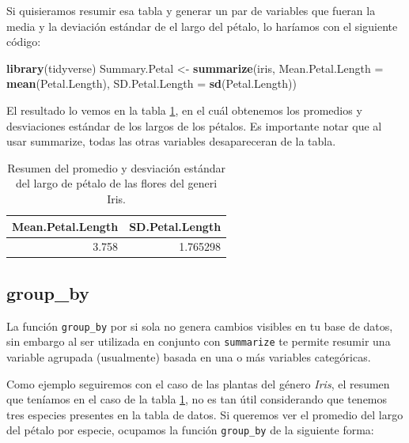 \documentclass[]{book}
\newenvironment{Shaded}{\begin{snugshade}}{\end{snugshade}}
\newcommand{\DataTypeTok}[1]{\textcolor[rgb]{0.13,0.29,0.53}{#1}}
\newcommand{\KeywordTok}[1]{\textcolor[rgb]{0.13,0.29,0.53}{\textbf{#1}}}
\newcommand{\NormalTok}[1]{#1}
\newcommand{\StringTok}[1]{\textcolor[rgb]{0.31,0.60,0.02}{#1}}
\begin{document}
Si quisieramos resumir esa tabla y generar un par de variables que
fueran la media y la deviación estándar de el largo del pétalo, lo
haríamos con el siguiente código:

\begin{Shaded}
\begin{Highlighting}[]
\KeywordTok{library}\NormalTok{(tidyverse)}
\NormalTok{Summary.Petal <-}\StringTok{ }\KeywordTok{summarize}\NormalTok{(iris, }\DataTypeTok{Mean.Petal.Length =} \KeywordTok{mean}\NormalTok{(Petal.Length), }
    \DataTypeTok{SD.Petal.Length =} \KeywordTok{sd}\NormalTok{(Petal.Length))}
\end{Highlighting}
\end{Shaded}

El resultado lo vemos en la tabla \ref{tab:SummaryPetaltab}, en el cuál
obtenemos los promedios y desviaciones estándar de los largos de los
pétalos. Es importante notar que al usar summarize, todas las otras
variables desapareceran de la tabla.

\begin{table}

\caption{\label{tab:SummaryPetaltab}Resumen del promedio y desviación estándar del largo de pétalo de las flores del generi Iris.}
\centering
\begin{tabular}[t]{rr}
\toprule
Mean.Petal.Length & SD.Petal.Length\\
\midrule
3.758 & 1.765298\\
\bottomrule
\end{tabular}
\end{table}

\hypertarget{group_by}{%
\subsection{group\_by}\label{group_by}}

La función \texttt{group\_by} por si sola no genera cambios visibles en
tu base de datos, sin embargo al ser utilizada en conjunto con
\texttt{summarize} te permite resumir una variable agrupada (usualmente)
basada en una o más variables categóricas.

Como ejemplo seguiremos con el caso de las plantas del género
\emph{Iris}, el resumen que teníamos en el caso de la tabla
\ref{tab:SummaryPetaltab}, no es tan útil considerando que tenemos tres
especies presentes en la tabla de datos. Si queremos ver el promedio del
largo del pétalo por especie, ocupamos la función \texttt{group\_by} de
la siguiente forma:
\end{document}
